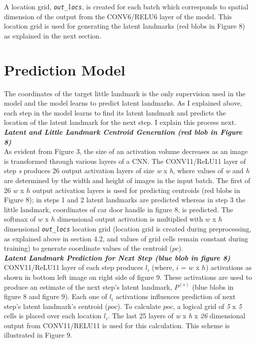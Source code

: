 \documentclass [11pt,letterpaper ,twoside ,openany ]{report}
\begin{document}
    A location grid, \textit{\texttt{out\_locs}},  is created for each batch which corresponds to spatial dimension of the output from the CONV6/RELU6 layer of the model. This location grid is used for generating the latent landmarks (red blobs in Figure 8) as explained in the next section.

    \section{Prediction Model}
    The coordinates of the target little landmark is the only supervision used in the model and the model learns to predict latent landmarks. As I explained above, each step in the model learns to find its latent landmark and predicts the location of the latent landmark for the next step. I explain this process next.\\

    \noindent
    \textbf{\textit{Latent and Little Landmark Centroid Generation (red blob in Figure 8)}}\\
    As evident from Figure 3, the size of an activation volume decreases as an image is transformed through various layers of a CNN. The CONV11/ReLU11 layer of step \textit {s} produces 26 output activation layers of size \textit {w} x \textit {h}, where values of \textit {w} and \textit {h} are determined by the width and height of images in the input batch. The first of 26 \(w\) x \(h\) output activation layers is used for predicting centroids (red blobs in Figure 8); in steps 1 and 2 latent landmarks are predicted whereas in step 3 the little landmark, coordinates of car door handle in figure 8, is predicted. The softmax of \(w\) x \(h\) dimensional output activation is multiplied with \(w\) x \(h\) dimensional \textit{\texttt{out\_locs}} location grid (location grid is created during preprocessing, as explained above in section 4.2, and values of grid cells remain constant during training) to generate coordinate values of the centroid (\(pc\)).\\

    \noindent
    \textbf{\textit{Latent Landmark Prediction for Next Step (blue blob in figure 8)}}\\
    CONV11/ReLU11 layer of each step produces \(l_i\) (where, \(i\) = \(w\) x \(h\)) activations as shown in bottom left image on right side of figure 9. These activations are used to produce an estimate of the next step's latent landmark, \(P^{(s)}\) (blue blobs in figure 8 and figure 9). Each one of \(l_i\) activations influences prediction of next step's latent landmark's centroid (\(poc\)). To calculate \(poc\), a logical grid of \textit {5} x \textit {5} cells is placed over each location \(l_i\). The last 25 layers of \textit {w} x \textit {h} x \textit {26} dimensional output from CONV11/RELU11 is used for this calculation. This scheme is illustrated in Figure 9.
\end{document}

